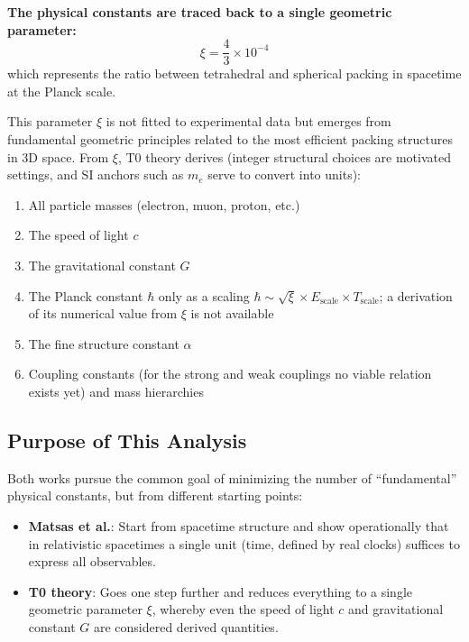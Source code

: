 	\begin{keyresult}
		\textbf{The physical constants are traced back to a single geometric parameter:}
		\[
		\xi = \frac{4}{3} \times 10^{-4}
		\]
		which represents the ratio between tetrahedral and spherical packing in spacetime at the Planck scale.
	\end{keyresult}
	
	This parameter $\xi$ is not fitted to experimental data but emerges from fundamental geometric principles related to the most efficient packing structures in 3D space. From $\xi$, T0 theory derives (integer structural choices are motivated settings, and SI anchors such as $m_e$ serve to convert into units):
	
	\begin{enumerate}
		\item All particle masses (electron, muon, proton, etc.)
		\item The speed of light $c$
		\item The gravitational constant $G$
		\item The Planck constant $\hbar$ only as a scaling $\hbar \sim \sqrt{\xi} \times E_{\text{scale}} \times T_{\text{scale}}$; a derivation of its numerical value from $\xi$ is not available
		\item The fine structure constant $\alpha$
		\item Coupling constants (for the strong and weak couplings no viable relation exists yet) and mass hierarchies
	\end{enumerate}
	
	\subsection{Purpose of This Analysis}
	
	Both works pursue the common goal of minimizing the number of ``fundamental'' physical constants, but from different starting points:
	
	\begin{itemize}
		\item \textbf{Matsas et al.}: Start from spacetime structure and show operationally that in relativistic spacetimes a single unit (time, defined by real clocks) suffices to express all observables.
		
		\item \textbf{T0 theory}: Goes one step further and reduces everything to a single geometric parameter $\xi$, whereby even the speed of light $c$ and gravitational constant $G$ are considered derived quantities.
	\end{itemize}
	
